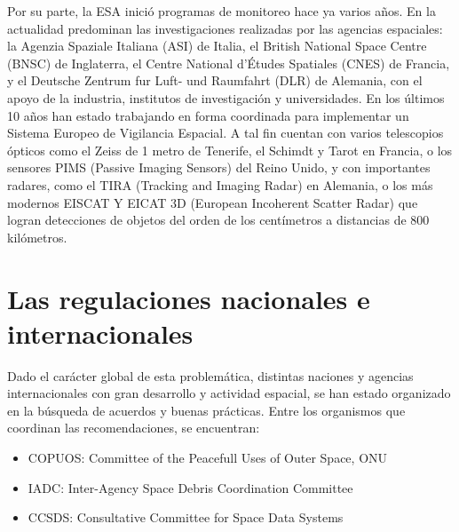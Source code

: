 Por su parte, la ESA inici\'o programas de monitoreo hace ya varios a\~nos. En la actualidad predominan las investigaciones realizadas por las agencias espaciales: la Agenzia Spaziale Italiana (ASI) de Italia, el  British National Space Centre (BNSC) de  Inglaterra, el Centre National d'Études Spatiales (CNES) de Francia, y el Deutsche Zentrum fur Luft- und Raumfahrt  (DLR) de Alemania, con el apoyo de la industria, institutos de investigaci\'on y universidades. En los \'ultimos 10 a\~nos han estado trabajando en forma coordinada para implementar un Sistema Europeo de Vigilancia Espacial.
A tal fin cuentan con varios telescopios \'opticos como el Zeiss de 1 metro de Tenerife, el Schimdt y Tarot en Francia, o los sensores PIMS (Passive Imaging Sensors) del Reino Unido, y con importantes radares, como el TIRA (Tracking and Imaging Radar) en Alemania, o los m\'as modernos EISCAT Y EICAT 3D (European Incoherent Scatter Radar) que logran detecciones de objetos del orden de los cent\'imetros a distancias de 800 kil\'ometros.





\section{Las regulaciones nacionales e internacionales}

Dado el car\'acter global de esta problem\'atica, distintas naciones y agencias internacionales con gran desarrollo y actividad espacial, se han estado organizado en la b\'usqueda de acuerdos y buenas pr\'acticas. Entre los organismos que coordinan las recomendaciones, se encuentran:\\

\begin{itemize}
\item COPUOS: Committee of the Peacefull Uses of Outer Space, \ac{ONU}
\item IADC: Inter-Agency Space Debris Coordination Committee
\item CCSDS: Consultative Committee for Space Data Systems
\end{itemize}


